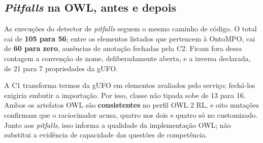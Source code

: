 \subsection{\textit{Pitfalls} na OWL, antes e depois}

As execuções do detector de \textit{pitfalls} \cite{poveda2014oops} seguem o mesmo caminho de código. O total cai de \textbf{105 para 56}; entre os elementos listados que pertencem à OntoMPO, cai de \textbf{60 para zero}, ausências de anotação fechadas pela C2. Ficam fora dessa contagem a convenção de nome, deliberadamente aberta, e a inversa declarada, de 21 para 7 propriedades da gUFO.

A C1 transforma termos da gUFO em elementos avaliados pelo serviço; fechá-los exigiria embutir a importação. Por isso, classe não tipada sobe de 13 para 16. Ambos os artefatos OWL são \textbf{consistentes} no perfil OWL 2 RL, e oito mutações confirmam que o raciocinador acusa, quatro nos dois e quatro só no customizado. Junto aos \textit{pitfalls}, isso informa a qualidade da implementação OWL; não substitui a evidência de capacidade das questões de competência.
